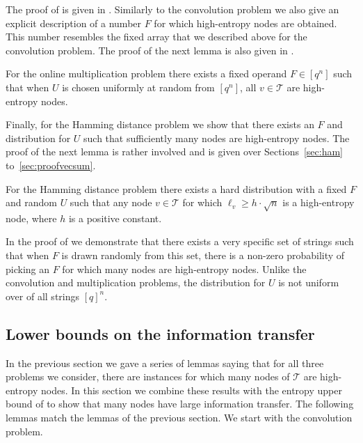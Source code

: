 \documentclass{toc}
\newcommand{\calT}{\ensuremath{\mathcal{T}}}
\newcommand{\lit}{large information transfer\xspace}
\begin{document}
The proof of  is given in . Similarly to the convolution problem we also give an explicit description of a number $F$ for which high-entropy nodes are obtained. This number resembles the fixed array that we described above for the convolution problem.
The proof of the next lemma is also given in .

\begin{lemma}
	\label{lem:mult-H-lower}
	For the online multiplication problem there exists a fixed operand $F\in [q^n]$ such that when $U$ is chosen uniformly at random from $[q^n]$, all $v \in \calT$ are high-entropy nodes.
\end{lemma}

Finally, for the Hamming distance problem we show that there exists an $F$ and distribution for $U$ such that sufficiently many nodes are high-entropy nodes. The proof of the next lemma is rather involved and is given over
%
Sections~\ref{sec:ham} to~\ref{sec:proofvecsum}.

\begin{lemma}
	\label{lem:ham-H-lower}
	For the Hamming distance problem there exists a hard distribution with a fixed $F$ and random $U$ such that any node $v\in\calT$ for which $\ell_v\geq h \cdot \sqrt{n}$ is a high-entropy node,
	where $h$ is a positive constant.
\end{lemma}

In the proof of  we demonstrate that there exists a very specific set of strings such that when $F$ is drawn randomly from this set, there is a non-zero probability of picking an $F$ for which many nodes are high-entropy nodes.
Unlike the convolution and multiplication problems, the distribution for $U$ is not uniform over of all strings $[q]^n$.



\subsection{Lower bounds on the information transfer}\label{sec:entropycomb}

In the previous section we gave a series of lemmas saying that for all three problems we consider, there are instances for which many nodes of $\calT$ are high-entropy nodes. In this section we combine these results with the entropy upper bound of  to show that many nodes have \lit.
The following lemmas match the lemmas of the previous section.
We start with the convolution problem.
\end{document}
